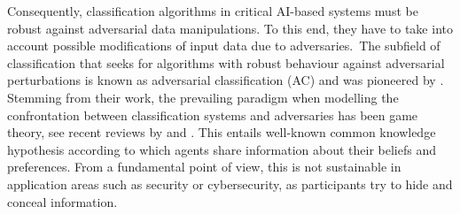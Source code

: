 Consequently, classification algorithms in critical AI-based systems must be robust against adversarial data manipulations. To this end, they have to take into account possible modifications of input data
due to adversaries.~The subfield of
classification that seeks for algorithms with robust behaviour against adversarial perturbations is known as adversarial classification (AC)
and  was pioneered by \cite{adversarialClassification2004}.
Stemming from their work, the prevailing paradigm 
when modelling the confrontation between classification systems and adversaries has been game theory, see recent reviews by \cite{BIGGIO2018317} and \cite{doi:10.1002/widm.1259}. This entails well-known common knowledge hypothesis \cite{Antos,gameTheoryACriticalIntroduction2004} according to which agents share information about their beliefs and preferences. From a fundamental point of view, this is 
not sustainable in  application areas such as security or cybersecurity,
as participants try to
hide and conceal information.  

